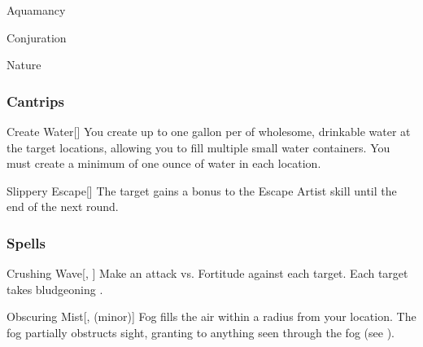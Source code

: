 \newpage
\begin{spellsection}{Aquamancy}

\begin{spellheader}
\end{spellheader}


 Conjuration

 Nature

\subsubsection{Cantrips}


\begin{freeability}{Create Water}[]
You create up to one gallon per  of wholesome, drinkable water at the target locations, allowing you to fill multiple small water containers.
You must create a minimum of one ounce of water in each location.
\end{freeability}


\begin{freeability}{Slippery Escape}[]
The target gains a  bonus to the Escape Artist skill until the end of the next round.
\end{freeability}

\end{spellsection}


\subsubsection{Spells}


\lowercase{\hypertarget{spell:Crushing Wave}{}}\label{spell:Crushing Wave}
\begin{freeability}[Rank 1]{\hypertarget{spell:Crushing Wave}{Crushing Wave}}[, ]
Make an attack vs. Fortitude against each target.
\hit Each target takes bludgeoning .
\end{freeability}
\vspace{0.25em}



\lowercase{\hypertarget{spell:Obscuring Mist}{}}\label{spell:Obscuring Mist}
\begin{freeability}[Rank 1]{\hypertarget{spell:Obscuring Mist}{Obscuring Mist}}[,  (minor)]
\targetrule
Fog fills the air within a \areamed radius  from your location.
The fog partially obstructs sight, granting  to anything seen through the fog (see ).
\end{freeability}
\vspace{0.25em}



